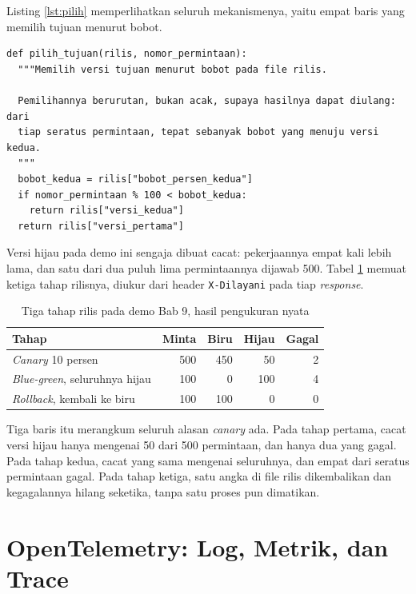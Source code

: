 Listing \ref{lst:pilih} memperlihatkan seluruh mekanismenya, yaitu empat
baris yang memilih tujuan menurut bobot.

\begin{lstlisting}[style=PythonStyle, caption={Pembagian rilis dalam empat baris, tersedia di \berkas{sources/chapter09/proxy.py}}, label={lst:pilih}]
def pilih_tujuan(rilis, nomor_permintaan):
  """Memilih versi tujuan menurut bobot pada file rilis.

  Pemilihannya berurutan, bukan acak, supaya hasilnya dapat diulang: dari
  tiap seratus permintaan, tepat sebanyak bobot yang menuju versi kedua.
  """
  bobot_kedua = rilis["bobot_persen_kedua"]
  if nomor_permintaan % 100 < bobot_kedua:
    return rilis["versi_kedua"]
  return rilis["versi_pertama"]
\end{lstlisting}

Versi hijau pada demo ini sengaja dibuat cacat: pekerjaannya empat kali lebih
lama, dan satu dari dua puluh lima permintaannya dijawab 500. Tabel
\ref{tab:rilis} memuat ketiga tahap rilisnya, diukur dari header
\texttt{X-Dilayani} pada tiap \textit{response}.

\begin{table}[!htb]
  \centering
  \caption{Tiga tahap rilis pada demo Bab 9, hasil pengukuran nyata}
  \label{tab:rilis}
  \begin{tabularx}{\textwidth}{Xrrrr}
    \hline
    \textbf{Tahap} & \textbf{Minta} & \textbf{Biru} & \textbf{Hijau} & \textbf{Gagal} \\
    \hline
    \textit{Canary} 10 persen & 500 & 450 & 50 & 2 \\
    \hline
    \textit{Blue-green}, seluruhnya hijau & 100 & 0 & 100 & 4 \\
    \hline
    \textit{Rollback}, kembali ke biru & 100 & 100 & 0 & 0 \\
    \hline
  \end{tabularx}
\end{table}

Tiga baris itu merangkum seluruh alasan \textit{canary} ada. Pada tahap
pertama, cacat versi hijau hanya mengenai 50 dari 500 permintaan, dan hanya
dua yang gagal. Pada tahap kedua, cacat yang sama mengenai seluruhnya, dan
empat dari seratus permintaan gagal. Pada tahap ketiga, satu angka di file
rilis dikembalikan dan kegagalannya hilang seketika, tanpa satu proses pun
dimatikan.

\section{OpenTelemetry: Log, Metrik, dan Trace}

